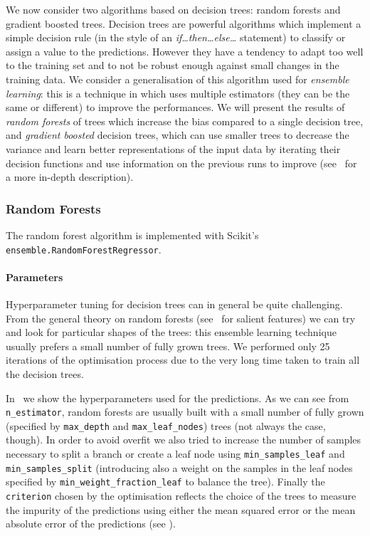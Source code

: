 We now consider two algorithms based on decision trees: random forests and gradient boosted trees.
Decision trees are powerful algorithms which implement a simple decision rule (in the style of an \emph{if\dots then\dots else\dots} statement) to classify or assign a value to the predictions.
However they have a tendency to adapt too well to the training set and to not be robust enough against small changes in the training data.
We consider a generalisation of this algorithm used for \emph{ensemble learning}: this is a technique in \ml which uses multiple estimators (they can be the same or different) to improve the performances.
We will present the results of \emph{random forests} of trees which increase the bias compared to a single decision tree, and \emph{gradient boosted} decision trees, which can use smaller trees to decrease the variance and learn better representations of the input data by iterating their decision functions and use information on the previous runs to improve (see~ for a more in-depth description).


\subsubsection{Random Forests}

The random forest algorithm is implemented with Scikit's \texttt{ensemble.RandomForestRegressor}.


\paragraph{Parameters}

Hyperparameter tuning for decision trees can in general be quite challenging.
From the general theory on random forests (see~ for salient features) we can try and look for particular shapes of the trees: this ensemble learning technique usually prefers a small number of fully grown trees.
We performed only 25 iterations of the optimisation process due to the very long time taken to train all the decision trees.

In~ we show the hyperparameters used for the predictions.
As we can see from \texttt{n\_estimator}, random forests are usually built with a small number of fully grown (specified by \texttt{max\_depth} and \texttt{max\_leaf\_nodes}) trees (not always the case, though).
In order to avoid overfit we also tried to increase the number of samples necessary to split a branch or create a leaf node using \texttt{min\_samples\_leaf} and \texttt{min\_samples\_split} (introducing also a weight on the samples in the leaf nodes specified by \texttt{min\_weight\_fraction\_leaf} to balance the tree).
Finally the \texttt{criterion} chosen by the optimisation reflects the choice of the trees to measure the impurity of the predictions using either the mean squared error or the mean absolute error of the predictions (see ).

